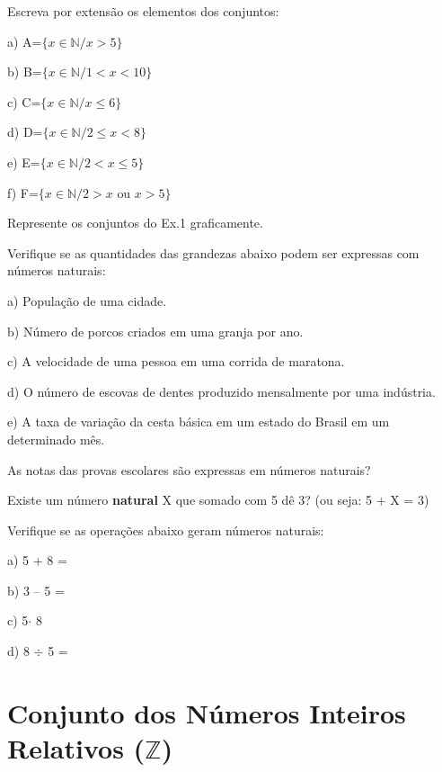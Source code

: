 \begin{exercicios}
    \exitem{} Escreva por extensão os elementos dos conjuntos:
    \begin{multicols}{2}
        a) A=$ \{x \in \mathbb{N} / x > 5 \}$ 

        b) B=$ \{ x \in \mathbb{N} / 1 < x < 10 \}$ 

        c) C=$ \{ x \in \mathbb{N} / x \leq 6 \} $
        
        d) D=$ \{ x \in \mathbb{N} / 2 \leq x < 8 \} $
        
        e) E=$ \{x \in \mathbb{N} / 2 < x \leq 5 \}$
        
        f) F=$ \{x \in \mathbb{N} / 2 > x \textrm{ ou } x > 5 \}$
    \end{multicols}
	\exitem{} Represente os conjuntos do Ex.1 graficamente.

	\exitem{} Verifique se as quantidades das grandezas abaixo podem ser expressas com números naturais:

        a) População de uma cidade.

        b) Número de porcos criados em uma granja por ano.

        c) A velocidade de uma pessoa em uma corrida de maratona.

        d) O número de escovas de dentes produzido mensalmente por uma indústria.

        e) A taxa de variação da cesta básica em um estado do Brasil em um determinado mês.

	\exitem{} As notas das provas escolares são expressas em números naturais?

	\exitem{} Existe um número \textbf{natural} X que somado com 5 dê 3? (ou seja: 5 + X = 3)

	\exitem{} Verifique se as operações abaixo geram números naturais:
    \begin{multicols}{2}
        a) 5 + 8 = 

        b) 3 – 5 =
        
        c) 5$\cdot$ 8
        
        d) 8 $\div$ 5 =
    \end{multicols}
\end{exercicios}

\section{Conjunto dos Números Inteiros Relativos ($\mathbb{Z}$)}


